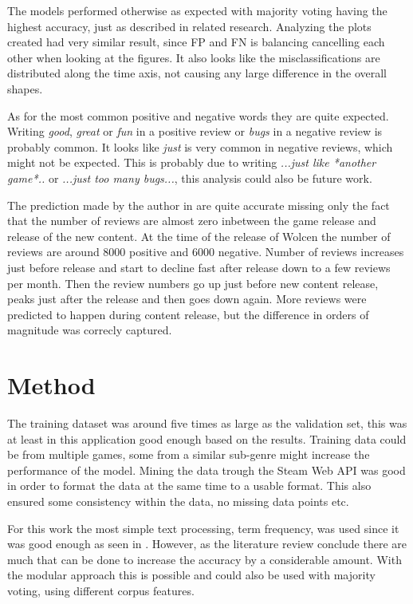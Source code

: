 The models performed otherwise as expected with majority voting having the highest accuracy, just as described in related research. 
Analyzing the plots created had very similar result, since FP and FN is balancing cancelling each other when looking at the figures. 
It also looks like the misclassifications are distributed along the time axis, not causing any large difference in the overall shapes. 


As for the most common positive and negative words they are quite expected. 
Writing \emph{good}, \emph{great} or \emph{fun} in a positive review or \emph{bugs} in a negative review is probably common. 
It looks like \emph{just} is very common in negative reviews, which might not be expected. 
This is probably due to writing \emph{...just like *another game*..} or \emph{...just too many bugs...}, this analysis could also be future work.


The prediction made by the author in  are quite accurate missing only the fact that the number of reviews are almost zero inbetween the game release and release of the new content. 
At the time of the release of Wolcen the number of reviews are around 8000 positive and 6000 negative. 
Number of reviews increases just before release and start to decline fast after release down to a few reviews per month. 
Then the review numbers go up just before new content release, peaks just after the release and then goes down again. 
More reviews were predicted to happen during content release, but the difference in orders of magnitude was correcly captured. 


\section{Method}
\label{sec:discussion-method}


The training dataset was around five times as large as the validation set, this was at least in this application good enough based on the results. 
Training data could be from multiple games, some from a similar sub-genre might increase the performance of the model. 
Mining the data trough the Steam Web API was good in order to format the data at the same time to a usable format. 
This also ensured some consistency within the data, no missing data points etc. 


For this work the most simple text processing, term frequency, was used since it was good enough as seen in . 
However, as the literature review conclude there are much that can be done to increase the accuracy by a considerable amount. 
With the modular approach this is possible and could also be used with majority voting, using different corpus features. 


